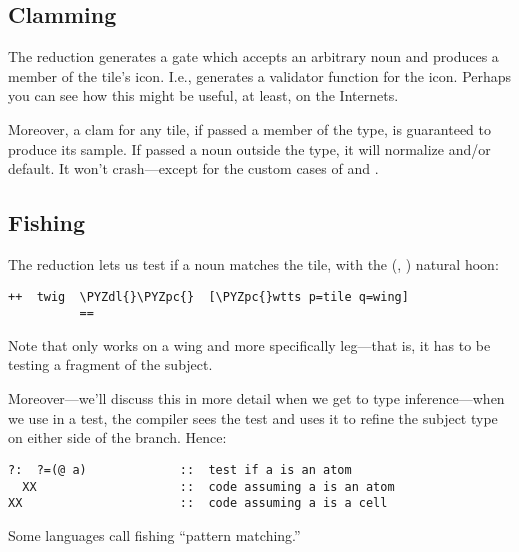 \subsection{Clamming}

The  reduction generates a gate which accepts an arbitrary
noun and produces a member of the tile's icon.  I.e., 
generates a validator function for the icon.  Perhaps you
can see how this might be useful, at least, on the Internets.

Moreover, a clam for any tile, if passed a member of the type, is
guaranteed to produce its sample.  If passed a noun outside
the type, it will normalize and/or default.  It won't crash---except for the custom cases of  and .

\subsection{Fishing}

The  reduction lets us test if a noun matches the tile,
with the  (, ) natural hoon:

\begin{framed_shaded}
\begin{Verbatim}[fontsize=\relsize{-2.5},fontseries=b,commandchars=\\\{\}]
++  twig  \PYZdl{}\PYZpc{}  [\PYZpc{}wtts p=tile q=wing]
          ==
\end{Verbatim}
\end{framed_shaded}
Note that  only works on a wing and more specifically leg---that is, it has to be testing a fragment of the subject.

Moreover---we'll discuss this in more detail when we get to type
inference---when we use  in a  test, the compiler sees
the test and uses it to refine the subject type on either side
of the branch.  Hence:

\begin{framed_shaded}
\begin{Verbatim}[fontsize=\relsize{-2.5},fontseries=b,commandchars=\\\{\}]
?:  ?=(@ a)             ::  test if a is an atom
  XX                    ::  code assuming a is an atom
XX                      ::  code assuming a is a cell
\end{Verbatim}
\end{framed_shaded}
Some languages call fishing ``pattern matching.'' 

